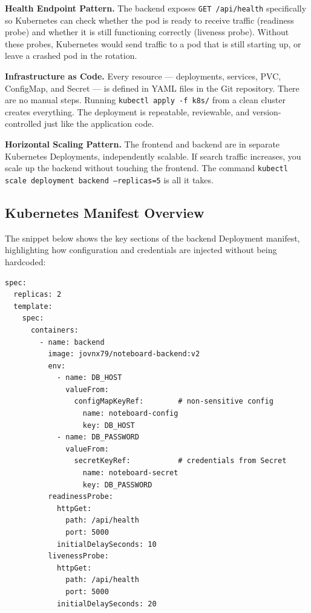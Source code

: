 \documentclass[12pt,a4paper]{article}
\begin{document}
\textbf{Health Endpoint Pattern.}
The backend exposes \texttt{GET /api/health} specifically so Kubernetes can check whether the pod is ready to receive traffic (readiness probe) and whether it is still functioning correctly (liveness probe). Without these probes, Kubernetes would send traffic to a pod that is still starting up, or leave a crashed pod in the rotation.

\textbf{Infrastructure as Code.}
Every resource --- deployments, services, PVC, ConfigMap, and Secret --- is defined in YAML files in the Git repository. There are no manual steps. Running \texttt{kubectl apply -f k8s/} from a clean cluster creates everything. The deployment is repeatable, reviewable, and version-controlled just like the application code.

\textbf{Horizontal Scaling Pattern.}
The frontend and backend are in separate Kubernetes Deployments, independently scalable. If search traffic increases, you scale up the backend without touching the frontend. The command \texttt{kubectl scale deployment backend --replicas=5} is all it takes.

\subsection{Kubernetes Manifest Overview}

The snippet below shows the key sections of the backend Deployment manifest, highlighting how configuration and credentials are injected without being hardcoded:

\begin{lstlisting}[style=yaml, caption={Backend Deployment manifest excerpt (k8s/backend-deployment.yaml)}]
spec:
  replicas: 2
  template:
    spec:
      containers:
        - name: backend
          image: jovnx79/noteboard-backend:v2
          env:
            - name: DB_HOST
              valueFrom:
                configMapKeyRef:        # non-sensitive config
                  name: noteboard-config
                  key: DB_HOST
            - name: DB_PASSWORD
              valueFrom:
                secretKeyRef:           # credentials from Secret
                  name: noteboard-secret
                  key: DB_PASSWORD
          readinessProbe:
            httpGet:
              path: /api/health
              port: 5000
            initialDelaySeconds: 10
          livenessProbe:
            httpGet:
              path: /api/health
              port: 5000
            initialDelaySeconds: 20
\end{lstlisting}
\end{document}
